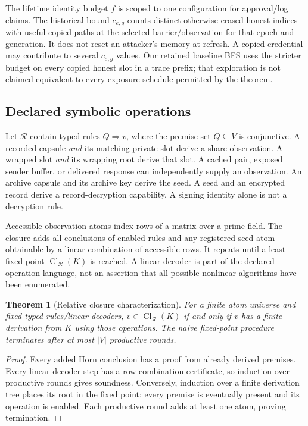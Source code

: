 \documentclass[pdflatex,sn-mathphys-num]{sn-jnl}
\theoremstyle{plain}
\newtheorem{theorem}{Theorem}
\theoremstyle{definition}
\newcommand{\Cl}{\operatorname{Cl}}
\begin{document}
The lifetime identity budget $f$ is scoped to one configuration for approval/log claims. The historical bound $c_{e,g}$ counts distinct otherwise-erased honest indices with useful copied paths at the selected barrier/observation for that epoch and generation. It does not reset an attacker's memory at refresh. A copied credential may contribute to several $c_{e,g}$ values. Our retained baseline BFS uses the stricter budget on every copied honest slot in a trace prefix; that exploration is not claimed equivalent to every exposure schedule permitted by the theorem.

\subsection{Declared symbolic operations}
Let $\mathcal R$ contain typed rules $Q\Rightarrow v$, where the premise set $Q\subseteq V$ is conjunctive. A recorded capsule \emph{and} its matching private slot derive a share observation. A wrapped slot \emph{and} its wrapping root derive that slot. A cached pair, exposed sender buffer, or delivered response can independently supply an observation. An archive capsule and its archive key derive the seed. A seed and an encrypted record derive a record-decryption capability. A signing identity alone is not a decryption rule.

Accessible observation atoms index rows of a matrix over a prime field. The closure adds all conclusions of enabled rules and any registered seed atom obtainable by a linear combination of accessible rows. It repeats until a least fixed point $\Cl_{\mathcal R}(K)$ is reached. A linear decoder is part of the declared operation language, not an assertion that all possible nonlinear algorithms have been enumerated.

\begin{theorem}[Relative closure characterization]\label{thm:closure}
For a finite atom universe and fixed typed rules/linear decoders, $v\in\Cl_{\mathcal R}(K)$ if and only if $v$ has a finite derivation from $K$ using those operations. The naive fixed-point procedure terminates after at most $|V|$ productive rounds.
\end{theorem}
\begin{proof}
Every added Horn conclusion has a proof from already derived premises. Every linear-decoder step has a row-combination certificate, so induction over productive rounds gives soundness. Conversely, induction over a finite derivation tree places its root in the fixed point: every premise is eventually present and its operation is enabled. Each productive round adds at least one atom, proving termination.
\end{proof}
\end{document}
